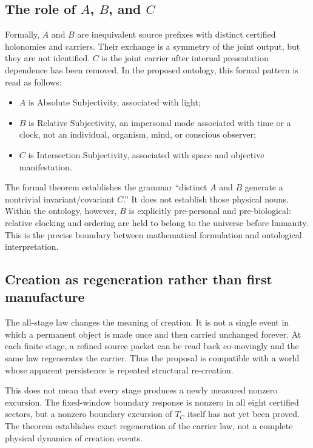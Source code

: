 \documentclass[11pt]{article}
\theoremstyle{definition}
\theoremstyle{remark}
\begin{document}
\subsection{The role of \texorpdfstring{$A$, $B$, and $C$}{A, B, and C}}

Formally, $A$ and $B$ are inequivalent source prefixes with distinct certified holonomies and carriers. Their exchange is a symmetry of the joint output, but they are not identified. $C$ is the joint carrier after internal presentation dependence has been removed. In the proposed ontology, this formal pattern is read as follows:
\begin{itemize}
\item $A$ is Absolute Subjectivity, associated with light;
\item $B$ is Relative Subjectivity, an impersonal mode associated with time or a clock, not an individual, organism, mind, or conscious observer;
\item $C$ is Intersection Subjectivity, associated with space and objective manifestation.
\end{itemize}

The formal theorem establishes the grammar ``distinct $A$ and $B$ generate a nontrivial invariant/covariant $C$.'' It does not establish those physical nouns. Within the ontology, however, $B$ is explicitly pre-personal and pre-biological: relative clocking and ordering are held to belong to the universe before humanity. This is the precise boundary between mathematical formulation and ontological interpretation.

\subsection{Creation as regeneration rather than first manufacture}

The all-stage law changes the meaning of creation. It is not a single event in which a permanent object is made once and then carried unchanged forever. At each finite stage, a refined source packet can be read back co-movingly and the same law regenerates the carrier. Thus the proposal is compatible with a world whose apparent persistence is repeated structural re-creation.

This does not mean that every stage produces a newly measured nonzero excursion. The fixed-window boundary response is nonzero in all eight certified sectors, but a nonzero boundary excursion of $T_C$ itself has not yet been proved. The theorem establishes exact regeneration of the carrier law, not a complete physical dynamics of creation events.
\end{document}
